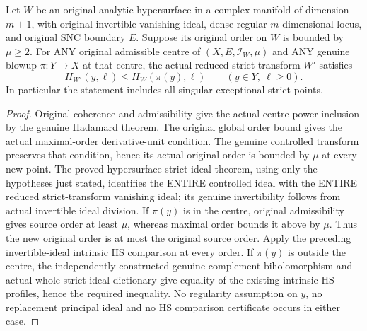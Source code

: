 \begin{theorem}
\label{hir:actual-hypersurface-blowup-all-order-hs-nonincreasing}
\leanok
{}
Let $W$ be an original analytic hypersurface in a complex manifold of
dimension $m+1$, with original invertible vanishing ideal, dense regular
$m$-dimensional locus, and original SNC boundary $E$. Suppose its original
order on $W$ is bounded by $\mu\ge2$. For ANY original admissible centre
of $(X,E,\mathcal I_W,\mu)$ and ANY genuine blowup $\pi:Y\to X$ at that
centre, the actual reduced strict transform $W'$ satisfies
\[
 H_{W'}(y,\ell)\le H_W(\pi(y),\ell)
 \qquad (y\in Y,\ \ell\ge0).
\]
In particular the statement includes all singular exceptional strict points.
\end{theorem}
\begin{proof}
Original coherence and admissibility give the actual centre-power inclusion
by the genuine Hadamard theorem. The original global order bound gives the
actual maximal-order derivative-unit condition. The genuine controlled
transform preserves that condition, hence its actual original order is
bounded by $\mu$ at every new point. The proved hypersurface strict-ideal
theorem, using only the hypotheses just stated, identifies the ENTIRE
controlled ideal with the ENTIRE reduced strict-transform vanishing ideal;
its genuine invertibility follows from actual invertible ideal division.
If $\pi(y)$ is in the centre, original admissibility gives source order at
least $\mu$, whereas maximal order bounds it above by $\mu$. Thus the
new original order is at most the original source order. Apply the preceding
invertible-ideal intrinsic HS comparison at every order. If $\pi(y)$ is
outside the centre, the independently constructed genuine complement
biholomorphism and actual whole strict-ideal dictionary give equality of
the existing intrinsic HS profiles, hence the required inequality. No
regularity assumption on $y$, no replacement principal ideal and no HS
comparison certificate occurs in either case.
\end{proof}
